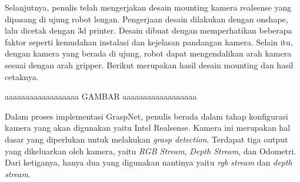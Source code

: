 Selanjutnya, penulis telah mengerjakan desain mounting kamera realsense yang dipasang di ujung robot lengan.
Pengerjaan desain dilakukan dengan onshape, lalu dicetak dengan 3d printer. Desain dibuat dengan memperhatikan
beberapa faktor seperti kemudahan instalasi dan kejelasan pandangan kamera. Selain itu, dengan kamera yang
berada di ujung, robot dapat mengendalikan arah kamera sesuai dengan arah gripper. Berikut merupakan hasil desain mounting
dan hasil cetaknya.

aaaaaaaaaaaaaaaaaa GAMBAR aaaaaaaaaaaaaaaaaa

Dalam proses implementasi GraspNet, penulis berada dalam tahap konfigurasi kamera yang akan digunakan yaitu Intel Realsense.
Kamera ini merupakan hal dasar yang diperlukan untuk melakukan \emph{grasp detection}. Terdapat tiga output yang dikeluarkan oleh kamera,
yaitu \emph{RGB Stream}, \emph{Depth Stream}, dan Odometri. Dari ketiganya, hanya dua yang digunakan nantinya yaitu \emph{rgb stream}
dan \emph{depth stream}.
